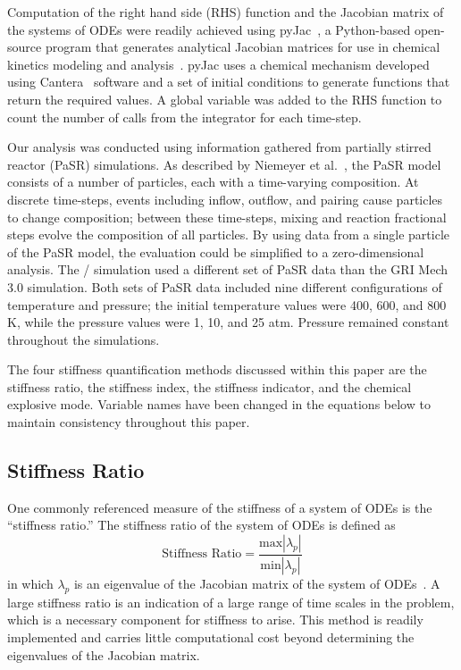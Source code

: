 \documentclass[12pt]{ussci}
\begin{document}
Computation of the right hand side (RHS) function and the Jacobian matrix of the systems of ODEs were readily achieved using pyJac~\cite{pyJac:1.0.2}, a Python-based open-source program that generates analytical Jacobian matrices for use in chemical kinetics modeling and analysis~\cite{Niemeyer:2017}.
pyJac uses a chemical mechanism developed using Cantera~\cite{Goodwin:2015aa} software and a set of initial conditions to generate functions that return the required values.  A global variable was added to the RHS function to count the number of calls from the integrator for each time-step.

Our analysis was conducted using information gathered from partially stirred reactor (PaSR) simulations.
As described by Niemeyer et al.~\cite{Niemeyer:2017}, the PaSR model consists of a number of particles, each with a time-varying composition.
At discrete time-steps, events including inflow, outflow, and pairing cause particles to change composition; between these time-steps, mixing and reaction fractional steps evolve the composition of all particles.
By using data from a single particle of the PaSR model, the evaluation could be simplified to a zero-dimensional analysis.
The \slash {} simulation used a different set of PaSR data than the GRI Mech 3.0 simulation.
Both sets of PaSR data included nine different configurations of temperature and pressure; the initial temperature values were 400, 600, and 800 K, while the pressure values were 1, 10, and 25 atm.
Pressure remained constant throughout the simulations.



The four stiffness quantification methods discussed within this paper are the stiffness ratio, the stiffness index, the stiffness indicator, and the chemical explosive mode.
Variable names have been changed in the equations below to maintain consistency throughout this paper.

\subsection{Stiffness Ratio}
One commonly referenced measure of the stiffness of a system of ODEs is the ``stiffness ratio.''
The stiffness ratio of the system of ODEs is defined as
\begin{equation}
	\textrm{Stiffness Ratio} = \frac{\textrm{max}|\lambda_p|}{\textrm{min}|\lambda_p|}
\end{equation}
in which $\lambda_p$ is an eigenvalue of the Jacobian matrix of the system of ODEs~\cite{LeVeque2007}.
A large stiffness ratio is an indication of a large range of time scales in the problem, which is a necessary component for stiffness to arise.
This method is readily implemented and carries little computational cost beyond determining the eigenvalues of the Jacobian matrix.
\end{document}
